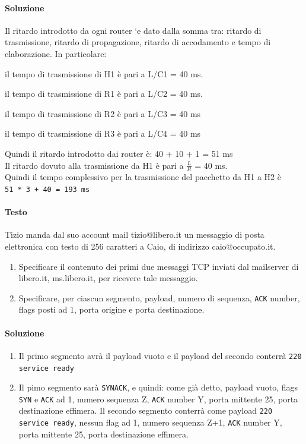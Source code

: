 \documentclass[10pt]{article}
\begin{document}
\paragraph{Soluzione} Il ritardo introdotto da ogni router `e dato dalla somma
tra: ritardo di trasmissione, ritardo di propagazione, ritardo di
accodamento e tempo di elaborazione. In particolare:
\begin{list}{-}{}
\item il tempo di trasmissione di H1 è pari a L/C1 = 40 ms.
\item il tempo di trasmissione di R1 è pari a L/C2 = 40 ms.
\item il tempo di trasmissione di R2 è pari a L/C3 = 40 ms
\item il tempo di trasmissione di R3 è pari a L/C4 = 40 ms
\end{list}
Quindi il ritardo introdotto dai router è: 40 + 10 + 1 = 51 ms\\
Il ritardo dovuto alla trasmissione da H1 è pari a $\frac{L}{R}$ = 40 ms.\\
Quindi il tempo complessivo per la trasmissione del pacchetto da H1 a H2 è\\
\texttt{51 * 3 + 40 = 193 ms}
\pagebreak
\paragraph{Testo} Tizio manda dal suo account mail tizio@libero.it un messaggio di posta elettronica con testo di 256 caratteri a Caio, di indirizzo caio@occupato.it.
\begin{enumerate}
\item  Specificare il contenuto dei primi due messaggi TCP inviati dal mailserver di libero.it, ms.libero.it, per ricevere tale messaggio.
\item Specificare, per ciascun segmento, payload, numero di sequenza, \texttt{ACK} number, flags posti ad 1, porta origine e porta destinazione.
\end{enumerate}
\paragraph{Soluzione}
\begin{enumerate}
\item Il primo segmento avrà il payload vuoto e il payload del secondo conterrà \texttt{220 service ready}
\item Il pimo segmento sarà \texttt{SYNACK}, e quindi: come già detto, payload vuoto, flags \texttt{SYN} e \texttt{ACK} ad 1, numero sequenza Z, \texttt{ACK} number Y, porta mittente 25, porta destinazione effimera. Il secondo segmento conterrà come payload \texttt{220 service ready}, nessun flag ad 1, numero sequenza Z+1, \texttt{ACK} number Y, porta mittente 25, porta destinazione effimera.
\end{enumerate}
\end{document}

